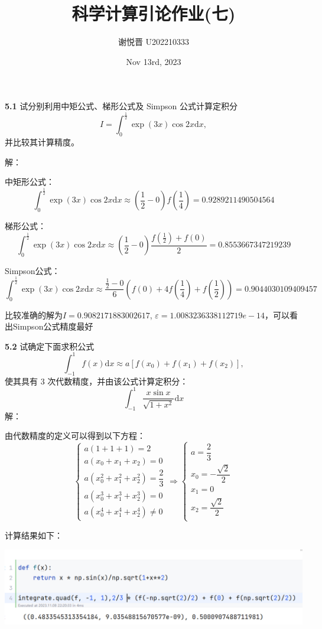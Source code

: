 \documentclass[a4paper,11pt,UTF8]{article}
\title{科学计算引论作业(七)}
\author{谢悦晋 \quad U202210333}
\date{Nov 13rd, 2023 }
\begin{document}
\maketitle
\textbf{5.1} 试分别利用中矩公式、梯形公式及 Simpson 公式计算定积分
$$
I=\int_0^{\frac12}\exp(3x)\cos2x\mathrm{d}x,
$$
并比较其计算精度。

\noindent 解：

中矩形公式：
$$
	\int_{0}^{\frac{1}{2}}\exp(3x)\cos 2x\mathrm{d}x\approx(\frac12-0)f(\frac14)=0.9289211490504564
$$

梯形公式：
$$
\int_{0}^{\frac{1}{2}}\exp(3x)\cos 2x\mathrm{d}x\approx(\frac12-0)\frac{f(\frac12)+f(0)}{2}=0.8553667347219239
$$

Simpson公式：
$$
\int_{0}^{\frac{1}{2}}\exp(3x)\cos 2x\mathrm{d}x\approx\frac{\frac12-0}{6}(f(0)+4f(\frac14)+f(\frac12))=0.9044030109409457
$$

比较准确的解为$I=0.9082171883002617$, $\varepsilon=1.0083236338112719e-14$，可以看出Simpson公式精度最好

\textbf{5.2} 试确定下面求积公式
$$
\int_{-1}^1f(x)\mathrm{d}x\approx a[f(x_0)+f(x_1)+f(x_2)],
$$
使其具有 3 次代数精度，并由该公式计算定积分：
$$
	\int_{-1}^1\frac{x\sin x}{\sqrt{1+x^2}}\mathrm{d}x
$$
\noindent 解：

由代数精度的定义可以得到以下方程：
$$
\begin{cases}
	 a(1+1+1)=2\\
	 a(x_0+x_1+x_2)=0\\
	 a(x_0^2+x_1^2+x_2^2)=\dfrac{2}{3}\\
	 a(x_0^3+x_1^3+x_2^3)=0\\
	 a(x_0^4+x_1^4+x_2^4)\neq0
\end{cases}\Rightarrow
\begin{cases}
	a=\dfrac{2}{3}\\
	x_0=-\dfrac{\sqrt{2}}{2}\\
	x_1=0\\
	x_2=\dfrac{\sqrt{2}}{2}\\
\end{cases}
$$

计算结果如下：

\includegraphics[width=1\textwidth]{5.2_1}
\end{document}
